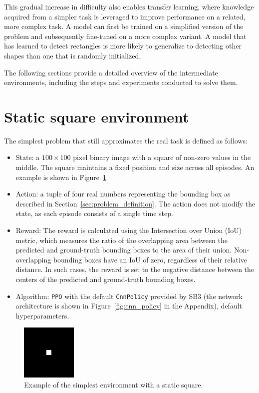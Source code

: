 \documentclass[
  digital,     %
  oneside,     %
  nosansbold,  %
  nocolorbold, %
  lof,         %
  lot,         %
]{fithesis4}
\begin{document}
This gradual increase in difficulty also enables transfer learning, where knowledge acquired from a simpler task is leveraged to improve performance on a related, more complex task. A model can first be trained on a simplified version of the problem and subsequently fine-tuned on a more complex variant. A model that has learned to detect rectangles is more likely to generalize to detecting other shapes than one that is randomly initialized.

The following sections provide a detailed overview of the intermediate environments, including the steps and experiments conducted to solve them.

\section{Static square environment}
The simplest problem that still approximates the real task is defined as follows:
\begin{itemize}
    \item State: a $100\times100$ pixel binary image with a square of non-zero values in the middle. The square maintains a fixed position and size across all episodes. An example is shown in Figure~\ref{fig:env0}
    \item Action: a tuple of four real numbers representing the bounding box as described in Section~\ref{sec:problem_definition}. The action does not modify the state, as each episode consists of a single time step.
    \item Reward: The reward is calculated using the Intersection over Union (IoU) metric, which measures the ratio of the overlapping area between the predicted and ground-truth bounding boxes to the area of their union. Non-overlapping bounding boxes have an IoU of zero, regardless of their relative distance. In such cases, the reward is set to the negative distance between the centers of the predicted and ground-truth bounding boxes.
    \item Algorithm: \texttt{PPO} with the default \texttt{CnnPolicy} provided by SB3 (the network architecture is shown in Figure~\ref{fig:cnn_policy} in the Appendix), default hyperparameters.
\end{itemize}

\begin{figure}[h]
    \includegraphics[width=0.25\linewidth]{env_examples/env0.jpg}
    \caption{Example of the simplest environment with a static square.}
    \label{fig:env0}
\end{figure}
\end{document}
